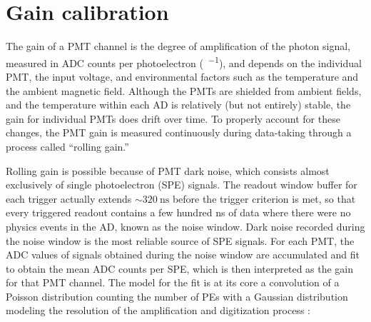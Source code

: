 \section{Gain calibration}
\label{sec:gain}

The gain of a PMT channel is the degree of amplification
of the photon signal,
measured in ADC counts per photoelectron (\si{\adc\per\pe}),
and depends on the individual PMT, the input voltage,
and environmental factors such as the temperature
and the ambient magnetic field.
Although the PMTs are shielded from ambient fields,
and the temperature within each AD is relatively (but not entirely) stable,
the gain for individual PMTs does drift over time.
To properly account for these changes,
the PMT gain is measured continuously during data-taking
through a process called ``rolling gain.''

Rolling gain is possible because of PMT dark noise,
which consists almost exclusively of single photoelectron (SPE) signals.
The readout window buffer for each trigger actually extends $\sim\SI{320}{\ns}$
before the trigger criterion is met,
so that every triggered readout contains a few hundred \si{\ns}
of data where there were no physics events in the AD, known as the noise window.
Dark noise recorded during the noise window is the most reliable source
of SPE signals.
For each PMT, the ADC values of signals obtained during the noise window
are accumulated and fit to obtain the mean ADC counts per SPE,
which is then interpreted as the gain for that PMT channel.
The model for the fit is at its core a convolution of
a Poisson distribution counting the number of PEs
with a Gaussian distribution modeling the resolution of
the amplification and digitization process \cite{spe_calib}:

